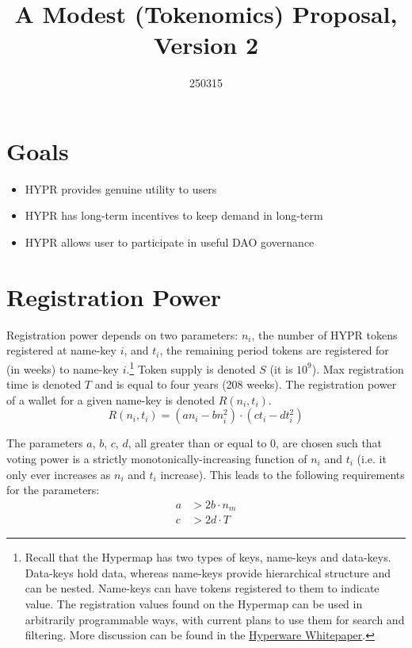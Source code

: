 \documentclass{article}
\title{A Modest (Tokenomics) Proposal, Version 2}
\date{250315}
\author{}
\begin{document}
\maketitle

\section{Goals}\label{sec:goals}
\begin{itemize}
    \item HYPR provides genuine utility to users
    \item HYPR has long-term incentives to keep demand in long-term
    \item HYPR allows user to participate in useful DAO governance
\end{itemize}

\section{Registration Power}\label{sec:registration}

Registration power depends on two parameters: $n_i$, the number of HYPR tokens registered at name-key $i$, and $t_i$, the remaining period tokens are registered for (in weeks) to name-key $i$.\footnote{
	Recall that the Hypermap has two types of keys, name-keys and data-keys.
	Data-keys hold data, whereas name-keys provide hierarchical structure and can be nested.
	Name-keys can have tokens registered to them to indicate value.
	The registration values found on the Hypermap can be used in arbitrarily programmable ways, with current plans to use them for search and filtering.
	More discussion can be found in the \href{https://hyperware.ai/whitepaper.pdf}{Hyperware Whitepaper}.
}
Token supply is denoted $S$ (it is $10^9$).
Max registration time is denoted $T$ and is equal to four years (208 weeks).
The registration power of a wallet for a given name-key is denoted $R(n_i, t_i)$.
\begin{equation}
R(n_i, t_i) = (an_i - bn_i^2) \cdot (ct_i - dt_i^2)
\end{equation}

The parameters $a$, $b$, $c$, $d$, all greater than or equal to $0$, are chosen such that voting power is a strictly monotonically-increasing function of $n_i$ and $t_i$ (i.e. it only ever increases as $n_i$ and $t_i$ increase).
This leads to the following requirements for the parameters:
\begin{align}
	a &> 2b \cdot n_m\\
	c &> 2d \cdot T
\end{align}
\end{document}
